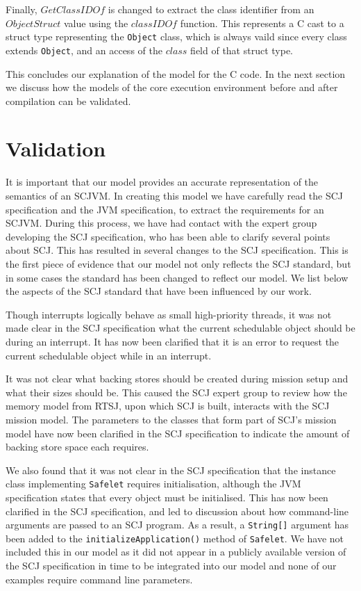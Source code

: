 Finally, $GetClassIDOf$ is changed to extract the class identifier
from an $ObjectStruct$ value using the $classIDOf$ function.
This represents a C cast to a struct type representing the
\texttt{Object} class, which is always vaild since every class extends
\texttt{Object}, and an access of the $class$ field of that struct
type.

This concludes our explanation of the model for the C code. 
In the next section we discuss how the models of the core execution
environment before and after compilation can be validated.

\section{Validation}
\label{cee-validation-section}

It is important that our model provides an accurate representation of
the semantics of an SCJVM.
In creating this model we have carefully read the SCJ specification
and the JVM specification, to extract the requirements for an SCJVM.
During this process, we have had contact with the expert group
developing the SCJ specification, who has been able to clarify several
points about SCJ.
This has resulted in several changes to the SCJ specification.
This is the first piece of evidence that our model not only reflects
the SCJ standard, but in some cases the standard has been changed to
reflect our model. 
We list below the aspects of the SCJ standard that have been
influenced by our work. 

Though interrupts logically behave as small high-priority threads, it
was not made clear in the SCJ specification what the current
schedulable object should be during an interrupt.
It has now been clarified that it is an error to request the current
schedulable object while in an interrupt.

It was not clear what backing stores should be created during mission
setup and what their sizes should be.
This caused the SCJ expert group to review how the memory model from
RTSJ, upon which SCJ is built, interacts with the SCJ mission model.
The parameters to the classes that form part of SCJ's mission model
have now been clarified in the SCJ specification to indicate the
amount of backing store space each requires.

We also found that it was not clear in the SCJ specification that the
instance class implementing \texttt{Safelet} requires initialisation,
although the JVM specification states that every object must be
initialised.
This has now been clarified in the SCJ specification, and led to
discussion about how command-line arguments are passed to an SCJ
program. 
As a result, a \texttt{String[]} argument has been added to the
\texttt{initializeApplication()} method of \texttt{Safelet}.
We have not included this in our model as it did not appear in a
publicly available version of the SCJ specification in time to be
integrated into our model and none of our examples require command
line parameters.


